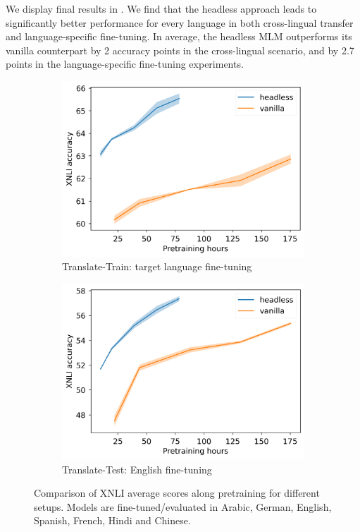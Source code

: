 We display final results in . We find that the headless approach leads to significantly better performance for every language in both cross-lingual transfer and language-specific fine-tuning. In average, the headless MLM outperforms its vanilla counterpart by 2 accuracy points in the cross-lingual scenario, and by 2.7 points in the language-specific fine-tuning experiments.

\begin{figure}[h]
    \centering
    \begin{subfigure}[b]{0.48\columnwidth}
         \includegraphics[width=\linewidth]{sources/part_2/headless/imgs/xnli_translate_train_p13.png}
         \caption{Translate-Train: target language fine-tuning}
         \label{fig:translate_train}
    \end{subfigure}
    \begin{subfigure}[b]{0.48\columnwidth}
         \includegraphics[width=\linewidth]{sources/part_2/headless/imgs/xnli_cross_p13.png}
         \caption{Translate-Test: English fine-tuning}
         \label{fig:translate_test}
    \end{subfigure}
    \caption{Comparison of XNLI average scores along pretraining for different setups. Models are fine-tuned/evaluated in Arabic, German, English, Spanish, French, Hindi and Chinese. %
    }
    \label{fig:train_curve_multilm}
\end{figure}

